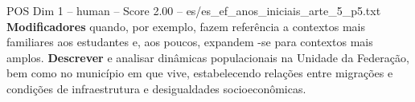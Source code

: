 \begin{textsample}{POS Dim 1 – human – Score 2.00 – es/es\_ef\_anos\_iniciais\_arte\_5\_p5.txt}  \label{ex:f1_pos_003}
\textbf{Modificadores} quando, por exemplo, fazem referência a contextos mais familiares aos estudantes e, aos poucos, expandem -se para contextos mais amplos. \textbf{Descrever} e analisar dinâmicas populacionais na Unidade da Federação, bem como no município em que vive, estabelecendo relações entre migrações e condições de infraestrutura e desigualdades socioeconômicas.

\end{textsample}
